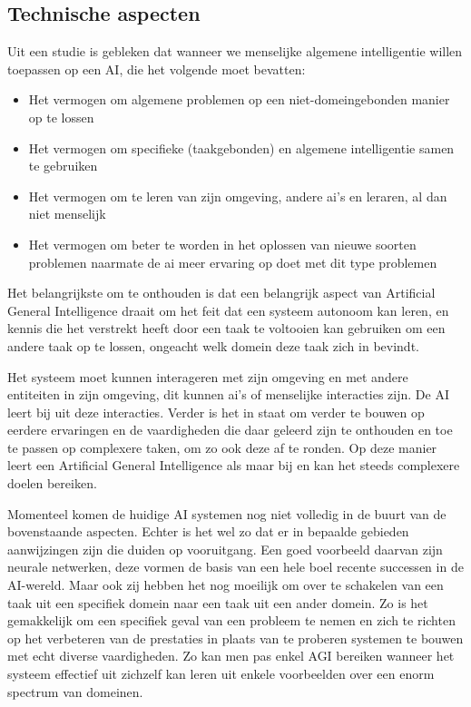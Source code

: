 \subsection{Technische aspecten}

Uit een studie is gebleken dat wanneer we menselijke algemene intelligentie willen toepassen op een AI, die het volgende moet bevatten: \linebreak

\begin{itemize}
    \item Het vermogen om algemene problemen op een niet-domeingebonden manier op te lossen
    \item Het vermogen om specifieke (taakgebonden) en algemene intelligentie samen te gebruiken
    \item Het vermogen om te leren van zijn omgeving, andere ai's en leraren, al dan niet menselijk
    \item Het vermogen om beter te worden in het oplossen van nieuwe soorten problemen naarmate de ai meer ervaring op doet met dit type problemen
\end{itemize}

Het belangrijkste om te onthouden is dat een belangrijk aspect van Artificial General Intelligence draait om het feit dat een systeem autonoom kan leren, en kennis die het verstrekt heeft door een taak te voltooien kan gebruiken om een andere taak op te lossen, ongeacht welk domein deze taak zich in bevindt. 

Het systeem moet kunnen interageren met zijn omgeving en met andere entiteiten in zijn omgeving, dit kunnen ai's of menselijke interacties zijn. De AI leert bij uit deze interacties. Verder is het in staat om verder te bouwen op eerdere ervaringen en de vaardigheden die daar geleerd zijn te onthouden en toe te passen op complexere taken, om zo ook deze af te ronden. Op deze manier leert een Artificial General Intelligence als maar bij en kan het steeds complexere doelen bereiken.

\autocite{goertzel2007artificial}

Momenteel komen de huidige AI systemen nog niet volledig in de buurt van de bovenstaande aspecten. Echter is het wel zo dat er in bepaalde gebieden aanwijzingen zijn die duiden op vooruitgang. Een goed voorbeeld daarvan zijn neurale netwerken, deze vormen de basis van een hele boel recente successen in de AI-wereld. Maar ook zij hebben het nog moeilijk om over te schakelen van een taak uit een specifiek domein naar een taak uit een ander domein. Zo is het gemakkelijk om een specifiek geval van een probleem te nemen en zich te richten op het verbeteren van de prestaties in plaats van te proberen systemen te bouwen met echt diverse vaardigheden. Zo kan men pas enkel AGI bereiken wanneer het systeem effectief uit zichzelf kan leren uit enkele voorbeelden over een enorm spectrum van domeinen.

